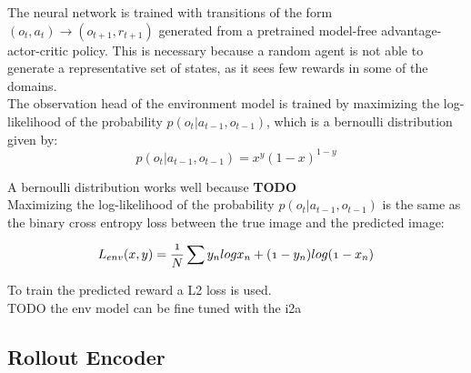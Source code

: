 The neural network is trained with transitions of the form $(o_t, a_t) \rightarrow (o_{t+1}, r_{t+1})$ generated from a pretrained model-free advantage-actor-critic policy. This is necessary because a random agent is not able to generate a representative set of states, as it sees few rewards in some of the domains.\\

 
The observation head of the environment model is trained by maximizing the log-likelihood of the probability $p(o_t | a_{t-1}, o_{t-1})$, which is a bernoulli distribution given by: 
\begin{equation} 
   p(o_t | a_{t-1}, o_{t-1}) = x^y (1-x)^{1-y} 
\end{equation}

A bernoulli distribution works well because \textbf{TODO}\\

   
Maximizing the log-likelihood of the probability $p(o_t | a_{t-1}, o_{t-1})$ is the same as the binary cross entropy loss between the true image and the predicted image:

   
\begin{equation} 
  \mathnormal{ 
  L_{env}(x, y) = \frac{1}{N} \sum y_n log x_n + (1-y_n) log(1- x_n) 
  } 
\end{equation}

To train the predicted reward a L2 loss is used.\\

TODO the env model can be fine tuned with the i2a
 
\subsection{Rollout Encoder}
 

